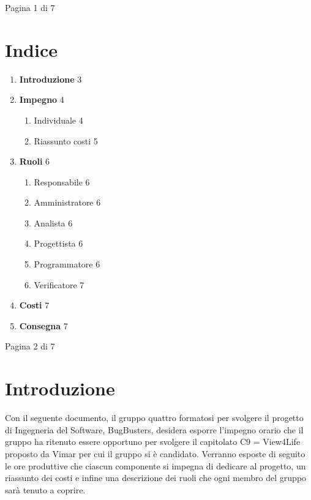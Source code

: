 \documentclass[a4paper,11pt]{article}
\begin{document}
\vfill
\begin{center}
Pagina 1 di 7
\end{center}

\newpage

\section*{Indice}
\begin{enumerate}[leftmargin=*]
\item \textbf{Introduzione} \hfill 3
\item \textbf{Impegno} \hfill 4
  \begin{enumerate}
  \item Individuale \hfill 4
  \item Riassunto costi \hfill 5
  \end{enumerate}
\item \textbf{Ruoli} \hfill 6
  \begin{enumerate}
  \item Responsabile \hfill 6
  \item Amministratore \hfill 6
  \item Analista \hfill 6
  \item Progettista \hfill 6
  \item Programmatore \hfill 6
  \item Verificatore \hfill 7
  \end{enumerate}
\item \textbf{Costi} \hfill 7
\item \textbf{Consegna} \hfill 7
\end{enumerate}

\vfill
\begin{center}
Pagina 2 di 7
\end{center}

\newpage

\section{Introduzione}
Con il seguente documento, il gruppo quattro formatosi per svolgere il progetto di Ingegneria del Software, BugBusters, desidera esporre l'impegno orario che il gruppo ha ritenuto essere opportuno per svolgere il capitolato C9 = View4Life proposto da Vimar per cui il gruppo si è candidato. Verranno esposte di seguito le ore produttive che ciascun componente si impegna di dedicare al progetto, un riassunto dei costi e infine una descrizione dei ruoli che ogni membro del gruppo sarà tenuto a coprire.
\end{document}

